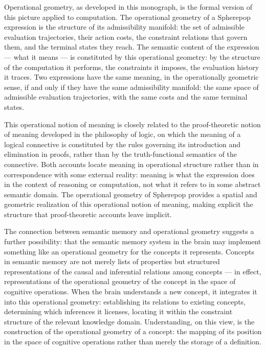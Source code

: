 \documentclass[12pt,openany]{book}
\theoremstyle{plain}
\theoremstyle{definition}
\theoremstyle{remark}
\begin{document}
Operational geometry, as developed in this monograph, is the formal version of this picture applied to computation. The operational geometry of a Spherepop expression is the structure of its admissibility manifold: the set of admissible evaluation trajectories, their action costs, the constraint relations that govern them, and the terminal states they reach. The semantic content of the expression — what it means — is constituted by this operational geometry: by the structure of the computation it performs, the constraints it imposes, the evaluation history it traces. Two expressions have the same meaning, in the operationally geometric sense, if and only if they have the same admissibility manifold: the same space of admissible evaluation trajectories, with the same costs and the same terminal states.

This operational notion of meaning is closely related to the proof-theoretic notion of meaning developed in the philosophy of logic, on which the meaning of a logical connective is constituted by the rules governing its introduction and elimination in proofs, rather than by the truth-functional semantics of the connective. Both accounts locate meaning in operational structure rather than in correspondence with some external reality: meaning is what the expression does in the context of reasoning or computation, not what it refers to in some abstract semantic domain. The operational geometry of Spherepop provides a spatial and geometric realization of this operational notion of meaning, making explicit the structure that proof-theoretic accounts leave implicit.

The connection between semantic memory and operational geometry suggests a further possibility: that the semantic memory system in the brain may implement something like an operational geometry for the concepts it represents. Concepts in semantic memory are not merely lists of properties but structured representations of the causal and inferential relations among concepts — in effect, representations of the operational geometry of the concept in the space of cognitive operations. When the brain understands a new concept, it integrates it into this operational geometry: establishing its relations to existing concepts, determining which inferences it licenses, locating it within the constraint structure of the relevant knowledge domain. Understanding, on this view, is the construction of the operational geometry of a concept: the mapping of its position in the space of cognitive operations rather than merely the storage of a definition.
\end{document}
